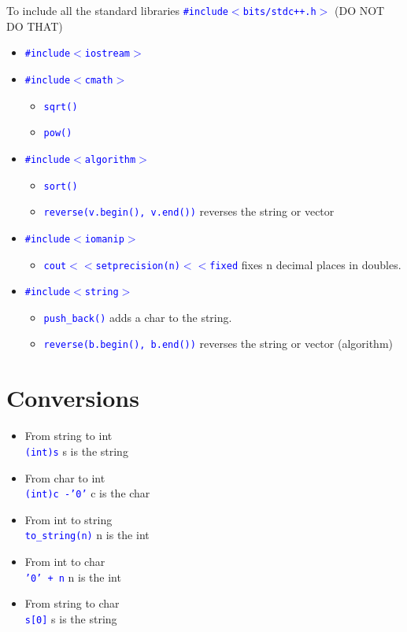 \documentclass[12pt]{article}
\newcommand{\code}[1]{\colorbox{light-gray}{\texttt{\textcolor{blue}{#1}}}}
\begin{document}
To include all the standard libraries \code{\#include$<$bits/stdc++.h$>$} (DO NOT DO THAT)
\begin{itemize}
  \item \code{\#include$<$iostream$>$}
  \item \code{\#include$<$cmath$>$}
  	\begin{itemize}
  		\item \code{sqrt()}
  		\item \code{pow()}
  	\end{itemize}
  
  \item \code{\#include$<$algorithm$>$}
  	\begin{itemize}
  		\item \code{sort()}
  		\item \code{reverse(v.begin(), v.end())} reverses the string or vector
  	\end{itemize}
  	
  \item \code{\#include$<$iomanip$>$}
  	\begin{itemize}
  		\item \code{cout$<<$setprecision(n)$<<$fixed} fixes n decimal places in doubles.
  	\end{itemize}
  	
  \item \code{\#include$<$string$>$}
  	\begin{itemize}
  		\item \code{push\_back()} adds a char to the string.
  		\item \code{reverse(b.begin(), b.end())} reverses the string or vector (algorithm)
  	\end{itemize}
  	
\end{itemize}
  	
\section{Conversions}
\begin{itemize}
	\item From string to int \\
	\code{(int)s} s is the string
	\item From char to int \\
	\code{(int)c -'0'} c is the char
	\item From int to string \\
	\code{to\_string(n)} n is the int
	\item From int to char \\
	\code{'0' + n} n is the int
	\item From string to char \\
	\code{s[0]} s is the string
\end{itemize}
\end{document}
